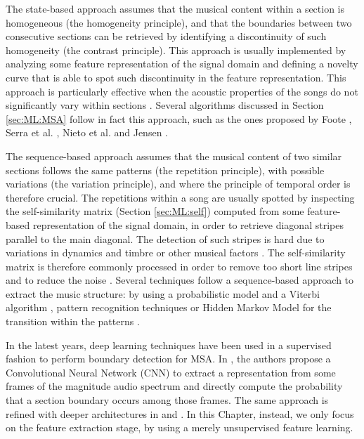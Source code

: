 The state-based approach assumes that the musical content within a section is homogeneous (the homogeneity principle), and that the boundaries between two consecutive sections can be retrieved by identifying a discontinuity of such homogeneity (the contrast principle). This approach is usually implemented by analyzing some feature representation of the signal domain and defining a novelty curve that is able to spot such discontinuity in the feature representation. This approach is particularly effective when the acoustic properties of the songs do not significantly vary within sections \cite{kaiser2010music}. Several algorithms discussed in Section \ref{sec:ML:MSA} follow in fact this approach, such as the ones proposed by Foote \cite{foote2000automatic}, Serra et al. \cite{Serra2014}, Nieto et al. \cite{NietoCNMF} and Jensen \cite{Jensen2007}.

The sequence-based approach assumes that the musical content of two similar sections follows the same patterns (the repetition principle), with possible variations (the variation principle), and where the principle of temporal order is therefore crucial. The repetitions within a song are usually spotted by inspecting the self-similarity matrix (Section \ref{sec:ML:self}) computed from some feature-based representation of the signal domain, in order to retrieve diagonal stripes parallel to the main diagonal. The detection of such stripes is hard due to variations in dynamics and timbre or other musical factors \cite{muller2007towards,muller2007information}. The self-similarity matrix is therefore commonly processed in order to remove too short line stripes \cite{lu2004repeating,ong2007structural} and to reduce the noise \cite{bartsch2005audio,wellhausen2003audio,goto2003chorus}. Several techniques follow a sequence-based approach to extract the music structure: by using a probabilistic model and a Viterbi algorithm \cite{shiu2006similar}, pattern recognition techniques \cite{rhodes2007algorithms} or Hidden Markov Model for the transition within the patterns \cite{aucouturier2002finding}.
 
In the latest years, deep learning techniques have been used in a supervised fashion to perform boundary detection for MSA. In \cite{ullrich2014boundary}, the authors propose a Convolutional Neural Network (CNN) to extract a representation from some frames of the magnitude audio spectrum and directly compute the probability that a section boundary occurs among those frames. The same approach is refined with deeper architectures in \cite{grill2015music} and \cite{grill2015_ismir}. In this Chapter, instead, we only focus on the feature extraction stage, by using a merely unsupervised feature learning. 



